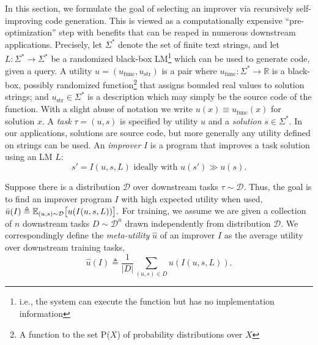 \documentclass{article} %
\newcommand{\metautil}{{\hat{u}}}
\newcommand{\exputil}{{\bar{u}}}
\newcommand{\sol}{{s}}
\newcommand{\D}{{\mathcal{D}}}
\newcommand{\defeq}{\triangleq}
\begin{document}
In this section, we formulate the goal of selecting an improver via recursively self-improving code generation. This is viewed as a computationally expensive ``pre-optimization'' step with benefits that can be reaped in numerous downstream applications. Precisely, let $\Sigma^*$ denote the set of finite text strings, and let $L: \Sigma^* \rightarrow \Sigma^*$ be a randomized black-box LM\footnote{i.e., the system can execute the function but has no implementation information} which can be used to generate code, given a query. A utility $u=(u_\text{func}, u_\text{str})$ is a pair where $u_\text{func}:\Sigma^* \rightarrow \mathbb{R}$ is a black-box, possibly randomized function\footnote{A function to the set P($X$) of probability distributions over $X$} that assigns bounded real values to solution strings; and $u_\text{str} \in \Sigma^*$ is a description  which may simply be the source code of the function. With a slight abuse of notation we write $u(x) \equiv u_\text{func}(x)$ for solution $x$. A \emph{task} $\tau = (u,\sol)$  is specified by utility $u$ and a \emph{solution} $\sol\in \Sigma^*$. In our applications, solutions are source code, but more generally any utility defined on strings can be used. An \emph{improver} $I$ is a program
%
that improves a task solution using an LM $L$:%
\begin{equation}
%
    \sol' = I(u, \sol, L) \text{ ideally with }
u(\sol') \gg u(\sol).
%
\end{equation}
%
%
\vspace{-15px}

Suppose there is a distribution $\D$ over downstream tasks $\tau\sim \D$. Thus, the goal is to find an improver program $I$ with high expected utility when used,%
%
$
%
    \exputil(I) \defeq \E_{(u, \sol) \sim \D} \bigl[u(I(u, \sol, L))\bigr].
%
$
%
%
For training, we assume we are given a collection of $n$ downstream tasks $D\sim \D^n$ drawn independently from distribution $\D$. We correspondingly define the \textit{meta-utility} $\metautil$ of an improver $I$ as the average utility over downstream training tasks, 
\begin{equation}
    \metautil(I)\defeq\frac{1}{|D|}\sum_{(u,\sol)\in D}u(I(u, \sol, L)).
\end{equation}
\vspace{-12px}
\end{document}

